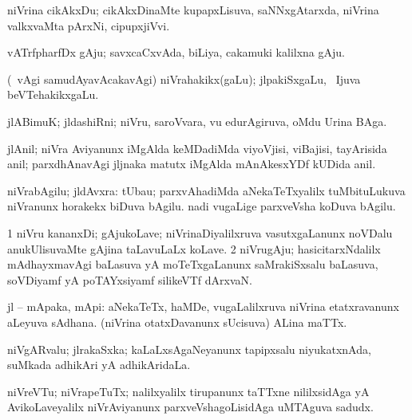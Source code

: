 {\bentry
{} 
\gl{\nA}
\expl{}
\bmng
{} 
\emng
\eentry

\bentry
{} 
\gl{\nA}
\expl{}
\bmng
niVrina cikAkxDu; cikAkxDinaMte kupapxLisuva, saNNxgAtarxda, niVrina valkxvaMta pArxNi, cipupxjiVvi. 
\emng
\eentry

\bentry
{} 
\gl{\nA}
\expl{}
\bmng
vATrfpharfDx gAju; savxcaCxvAda, biLiya, cakamuki kalilxna gAju. 
\emng
\eentry

\bentry
{} 
\gl{\nA}
\expl{}
\bmng
(\sA\ \bava vAgi samudAyavAcakavAgi) niVrahakikx(gaLu); jlpakiSxgaLu, \kanmu\ Ijuva beVTehakikxgaLu. 
\emng
\eentry

\bentry
{} 
\gl{\nA}
\expl{}
\bmng
jlABimuK; jldashiRni; niVru, saroVvara, \mo vu edurAgiruva, oMdu Urina BAga. 
\emng
\eentry

\bentry
{} 
\gl{\nA}
\expl{}
\bmng
jlAnil; niVra Aviyanunx iMgAlda keMDadiMda viyoVjisi, viBajisi, tayArisida anil; parxdhAnavAgi jljnaka matutx iMgAlda mAnAkesxYDf kUDida anil. 
\emng
\eentry

\bentry
{} 
\gl{\nA}
\expl{}
\bmng
niVrabAgilu; jldAvxra: 
\banum
{} tUbau; parxvAhadiMda aNekaTeTxyalilx tuMbituLukuva niVranunx horakekx biDuva bAgilu. 
 nadi \mo vugaLige parxveVsha koDuva bAgilu. 
\eanum
\emng
\eentry

\bentry
{} 
\gl{\nA}
\expl{}
\bmng
\bnum
\num{1} niVru kananxDi; gAjukoLave; niVrinaDiyalilxruva vasutxgaLanunx noVDalu anukUlisuvaMte gAjina taLavuLaLx koLave. 
\num{2} niVrugAju; hasicitarxNdalilx mAdhayxmavAgi baLasuva yA moTeTxgaLanunx saMrakiSxsalu baLasuva, soVDiyamf yA poTAYxsiyamf silikeVTf dArxvaN. 
\enum
\emng
\eentry

\bentry
{} 
\gl{\nA}
\expl{}
\bmng
jl -- mApaka, mApi: 
\banum
{} aNekaTeTx, haMDe, \mo vugaLalilxruva niVrina etatxravanunx aLeyuva sAdhana. 
 (niVrina otatxDavanunx sUcisuva) ALina maTTx. 
\eanum
\emng
\eentry

\bentry
{} 
\gl{\nA}
\expl{}
\bmng
niVgARvalu; jlrakaSxka; kaLaLxsAgaNeyanunx tapipxsalu niyukatxnAda, suMkada adhikAri yA adhikAridaLa. 
\emng
\eentry

\bentry
{} 
\gl{\nA}
\expl{}
\bmng
niVreVTu; niVrapeTuTx; nalilxyalilx tirupanunx taTTxne nililxsidAga yA AvikoLaveyalilx niVrAviyanunx parxveVshagoLisidAga uMTAguva sadudx. 
\emng
\eentry

}
